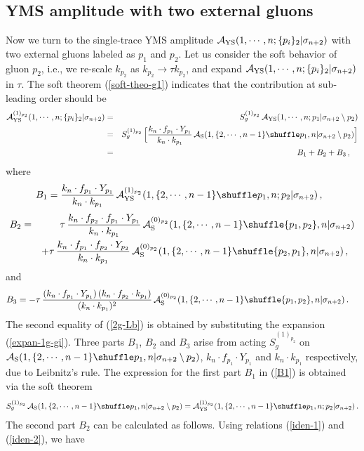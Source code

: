 \documentclass[preprint,showpacs,onecolumn,nofootinbib]{revtex4}
\newcommand{\bea}{\begin{eqnarray}}
\newcommand{\eea}{\end{eqnarray}}
\newcommand{\nn}{\nonumber \\}
\def\eref#1{(\ref{#1})}
\begin{document}
\subsection{YMS amplitude with two external gluons}
\label{subsec-2gluon}

Now we turn to the single-trace YMS amplitude ${\cal A}_{\rm YS}(1,\cdots,n;\{p_i\}_2|\sigma_{n+2})$ with two external gluons labeled as $p_1$ and $p_2$. Let us
consider the soft behavior of gluon $p_2$, i.e., we re-scale $k_{p_2}$ as $k_{p_2}\to\tau k_{p_2}$, and expand ${\cal A}_{\rm YS}(1,\cdots,n;\{p_i\}_2|\sigma_{n+2})$ in $\tau$. The soft theorem \eref{soft-theo-g1} indicates that the contribution at sub-leading order should be
%
\bea
{\cal A}^{(1)_{p_2}}_{\rm YS}(1,\cdots,n;\{p_i\}_2|\sigma_{n+2})&=&S^{(1)_{p_2}}_g\,{\cal A}_{\rm YS}(1,\cdots,n;p_1|\sigma_{n+2}\setminus p_2)\nn
&=&S^{(1)_{p_2}}_g\,\Big[{k_n\cdot f_{p_1}\cdot Y_{p_1}\over k_n\cdot k_{p_1}}\,{\cal A}_{\rm S}(1,\{2,\cdots,n-1\}\shuffle p_1,n|\sigma_{n+2}\setminus p_2)\Big]\nn
&=&B_1+B_2+B_3\,,~~~\label{2g-Lb}
\eea
%
where
%
\bea
B_1={k_n\cdot f_{p_1}\cdot Y_{p_1}\over k_n\cdot k_{p_1}}\,{\cal A}^{(1)_{p_2}}_{\rm YS}(1,\{2,\cdots,n-1\}\shuffle p_1,n;p_2|\sigma_{n+2})\,,~~\label{B1}
\eea
%
%
\bea
B_2&=&\tau\,{k_n\cdot f_{p_2}\cdot f_{p_1}\cdot Y_{p_1}\over k_n\cdot k_{p_1}}\,{\cal A}^{(0)_{p_2}}_{\rm S}(1,\{2,\cdots,n-1\}\shuffle \{p_1,p_2\},n|\sigma_{n+2})\nn
& &+\tau\,{k_n\cdot f_{p_1}\cdot f_{p_2}\cdot Y_{p_2}\over k_n\cdot k_{p_1}}\,{\cal A}^{(0)_{p_2}}_{\rm S}(1,\{2,\cdots,n-1\}\shuffle \{p_2,p_1\},n|\sigma_{n+2})\,,~~\label{B2}
\eea
%
and
%
\bea
B_3=-\tau\,{(k_n\cdot f_{p_1}\cdot Y_{p_1})\,(k_n\cdot f_{p_2}\cdot k_{p_1})\over (k_n\cdot k_{p_1})^2}\,{\cal A}^{(0)_{p_2}}_{\rm S}(1,\{2,\cdots,n-1\}\shuffle \{p_1,p_2\},n|\sigma_{n+2})\,.~~~\label{B3}
\eea
%
The second equality of \eref{2g-Lb} is obtained by substituting the expansion \eref{expan-1g-gi}. Three parts $B_1$, $B_2$ and $B_3$ arise from
acting $S^{(1)_{p_2}}_g$ on ${\cal A}_{\rm S}(1,\{2,\cdots,n-1\}\shuffle p_1,n|\sigma_{n+2}\setminus p_2)$, $k_n\cdot f_{p_1}\cdot Y_{p_1}$ and $k_n\cdot k_{p_1}$ respectively, due to Leibnitz's rule. The expression for the first part $B_1$ in \eref{B1} is obtained via the soft theorem
%
\bea
S^{(1)_{p_2}}_g\,{\cal A}_{\rm S}(1,\{2,\cdots,n-1\}\shuffle p_1,n|\sigma_{n+2}\setminus p_2)={\cal A}^{(1)_{p_2}}_{\rm YS}(1,\{2,\cdots,n-1\}\shuffle p_1,n;p_2|\sigma_{n+2})\,.
\eea
%
The second part $B_2$ can be calculated as follows.
Using relations \eref{iden-1} and \eref{iden-2}, we have
\end{document}
